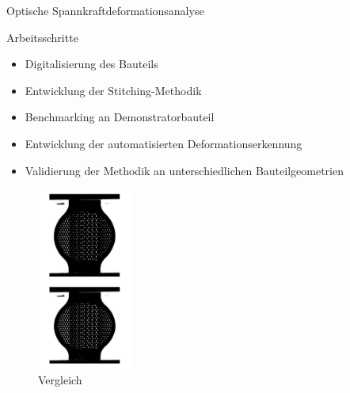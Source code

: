 \documentclass[../slides.tex]{subfiles}
\begin{document}
\begin{frame}{Optische Spannkraftdeformationsanalyse}
  \begin{minipage}[]{0.49\textwidth}
    \begin{block}{Arbeitsschritte}
      \begin{itemize}
        \item Digitalisierung des Bauteils
        \item Entwicklung der Stitching-Methodik
        \item Benchmarking an Demonstratorbauteil
        \item Entwicklung der automatisierten Deformationserkennung
        \item Validierung der Methodik an unterschiedlichen Bauteilgeometrien
      \end{itemize}
    \end{block}
  \end{minipage}
  \begin{minipage}[]{0.49\textwidth}
    \begin{figure}[]
      \includegraphics[height=170pt]{img_niklas/compare.png}
      \caption{Vergleich}
    \end{figure}
  \end{minipage}
\end{frame}
\end{document}
